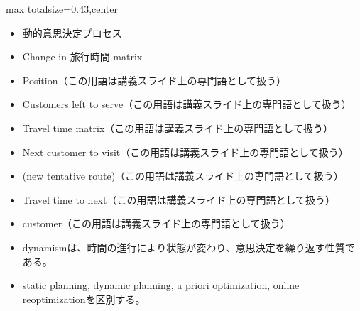 \clearpage
{}
\begin{minipage}[t]{0.405\textwidth}
\begin{adjustbox}{max totalsize={\textwidth}{0.43\textheight},center}
\begin{minipage}{\textwidth}\scriptsize
{}\begin{itemize}
\item 動的意思決定プロセス
\item Change in 旅行時間 matrix
\item Position（この用語は講義スライド上の専門語として扱う）
\item Customers left to serve（この用語は講義スライド上の専門語として扱う）
\item Travel time matrix（この用語は講義スライド上の専門語として扱う）
\item Next customer to visit（この用語は講義スライド上の専門語として扱う）
\item (new tentative route)（この用語は講義スライド上の専門語として扱う）
\item Travel time to next（この用語は講義スライド上の専門語として扱う）
\item customer（この用語は講義スライド上の専門語として扱う）
\end{itemize}\begin{itemize}
\item dynamismは、時間の進行により状態が変わり、意思決定を繰り返す性質である。
\item static planning, dynamic planning, a priori optimization, online reoptimizationを区別する。
\end{itemize}
\end{minipage}
\end{adjustbox}
\end{minipage}\hfill
